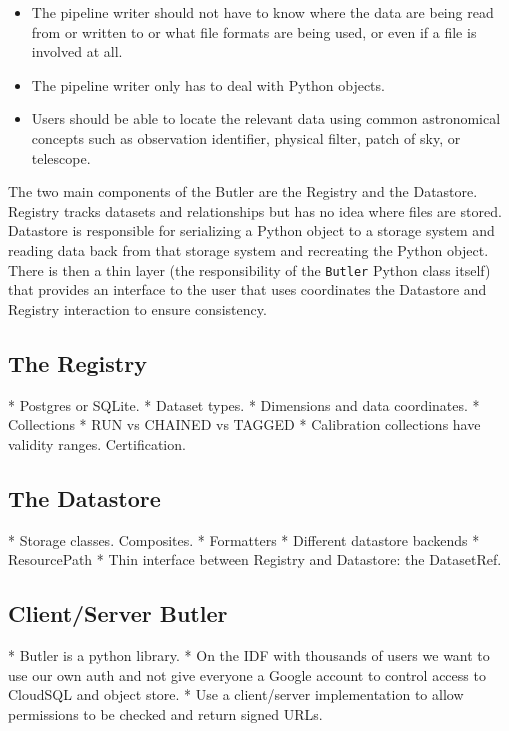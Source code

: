 \documentclass[]{spie}
\begin{document}
\begin{itemize}
\item The pipeline writer should not have to know where the data are being read from or written to or what file formats are being used, or even if a file is involved at all.
\item The pipeline writer only has to deal with Python objects.
\item Users should be able to locate the relevant data using common astronomical concepts such as observation identifier, physical filter, patch of sky, or telescope.
\end{itemize}

The two main components of the Butler are the Registry and the Datastore.
Registry tracks datasets and relationships but has no idea where files are stored.
Datastore is responsible for serializing a Python object to a storage system and reading data back from that storage system and recreating the Python object.
There is then a thin layer (the responsibility of the \texttt{Butler} Python class itself) that provides an interface to the user that uses coordinates the Datastore and Registry interaction to ensure consistency.

\subsection{The Registry}

* Postgres or SQLite.
* Dataset types.
* Dimensions and data coordinates.
* Collections
    * RUN vs CHAINED vs TAGGED
    * Calibration collections have validity ranges. Certification.

\subsection{The Datastore}

* Storage classes. Composites.
* Formatters
* Different datastore backends
* ResourcePath
* Thin interface between Registry and Datastore: the DatasetRef.

\subsection{Client/Server Butler}

* Butler is a python library.
* On the IDF with thousands of users we want to use our own auth and not give everyone a Google account to control access to CloudSQL and object store.
* Use a client/server implementation to allow permissions to be checked and return signed URLs.
\end{document}
